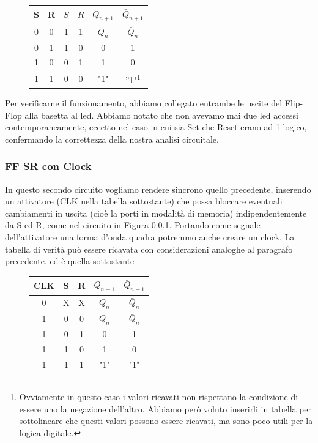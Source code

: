 \begin{savenotes}
\begin{figure}[H]
		\centering
		{\renewcommand{\arraystretch}{1.1}%
		\begin{tabular}{|c|c|c|c|c|c|}
		\hline
		S & R & $\bar S$ & $\bar R$ & $Q_{n+1}$ & $\bar Q_{n+1}$ \\
		\hline \hline
		0 & 0 & 1 & 1 & $Q_n$ & $\bar Q_n$\\
		\hline
		0 & 1 & 1 & 0 & 0 &1\\
		\hline
		1 & 0 & 0 & 1& 1 & 0\\
		\hline
		1 & 1 &0 &0 & "1" & ”1"\footnote{Ovviamente in questo caso i valori ricavati non rispettano la condizione di essere uno la negazione dell'altro. Abbiamo però voluto inserirli in tabella per sottolineare che questi valori possono essere ricavati, ma sono poco utili per la logica digitale.}\\
		\hline
		\end{tabular}}
		\label{tab11:FFSR}
        \end{figure}
        		\end{savenotes}


Per verificarne il funzionamento, abbiamo collegato entrambe le uscite del Flip-Flop alla basetta al led. Abbiamo notato che non avevamo mai due led accessi contemporaneamente, eccetto nel caso in cui sia Set che Reset erano ad 1 logico, confermando la correttezza della nostra analisi circuitale.

\subsubsection{FF SR con Clock}

In questo secondo circuito vogliamo rendere sincrono quello precedente, inserendo un attivatore (CLK nella tabella sottostante) che possa bloccare eventuali cambiamenti in uscita (cioè la porti in modalità di memoria) indipendentemente da S ed R, come nel circuito in Figura \ref{}. Portando come segnale dell'attivatore una forma d'onda quadra potremmo anche creare un clock. La tabella di verità può essere ricavata con considerazioni analoghe al paragrafo precedente, ed è quella sottostante

\begin{figure}[H]
		\centering
		{\renewcommand{\arraystretch}{1.1}%
		\begin{tabular}{|c||c|c|c|c|}
		\hline
		CLK & S & R & $Q_{n+1}$ & $\bar Q_{n+1}$  \\
		\hline \hline
		0 & X & X & $Q_n$ & $\bar Q_n$\\
		\hline \hline
		 1&0 & 0 & $Q_n$ & $\bar Q_n$\\
		\hline
		1&0 & 1 & 0 &1\\
		\hline
		1&1 & 0 & 1 & 0\\
		\hline
		1&1 & 1 & "1" & "1"\\
		\hline
		\end{tabular}}
		\label{tab11:FFSR2}
        \end{figure}

